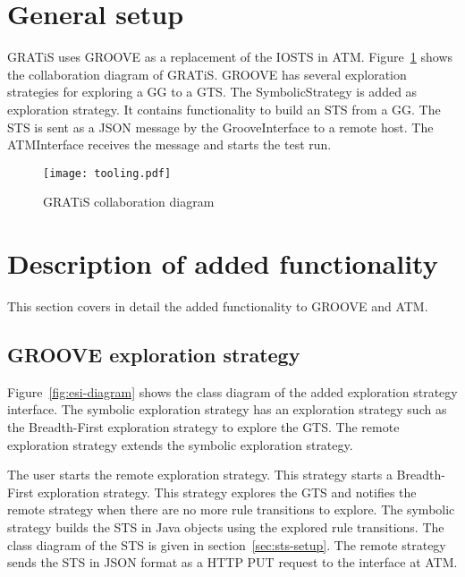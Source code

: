 \section{General setup}\label{sec:general-setup}
GRATiS uses GROOVE as a replacement of the IOSTS in ATM. Figure~\ref{fig:tooling} shows the collaboration diagram of GRATiS. GROOVE has several exploration strategies for exploring a GG to a GTS. The SymbolicStrategy is added as exploration strategy. It contains functionality to build an STS from a GG. The STS is sent as a JSON message by the GrooveInterface to a remote host. The ATMInterface receives the message and starts the test run.

\begin{figure}[ht]
  \begin{center}
    \texttt{[image: tooling.pdf]}
  \end{center}
  \caption{GRATiS collaboration diagram}
  \label{fig:tooling}
\end{figure}

\section{Description of added functionality}
This section covers in detail the added functionality to GROOVE and ATM. 

\subsection{GROOVE exploration strategy}
Figure~\ref{fig:esi-diagram} shows the class diagram of the added exploration strategy interface. The symbolic exploration strategy has an exploration strategy such as the Breadth-First exploration strategy to explore the GTS. The remote exploration strategy extends the symbolic exploration strategy.

The user starts the remote exploration strategy. This strategy starts a Breadth-First exploration strategy. This strategy explores the GTS and notifies the remote strategy when there are no more rule transitions to explore. The symbolic strategy builds the STS in Java objects using the explored rule transitions. The class diagram  of the STS is given in section~\ref{sec:sts-setup}. The remote strategy sends the STS in JSON format as a HTTP PUT request to the interface at ATM.

